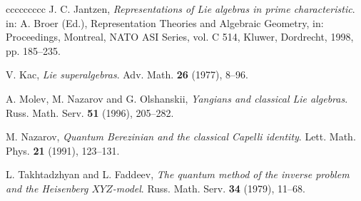 \documentclass[12pt,reqno]{amsart}
\numberwithin{equation}{section}
\theoremstyle{Theorem}
\theoremstyle{remark}
\numberwithin{equation}{section}
\begin{document}
\begin{thebibliography}{ccccccccc}
  J. C. Jantzen,
 {\em Representations of Lie algebras in prime characteristic}.
in: A. Broer (Ed.), Representation Theories and Algebraic Geometry, in: Proceedings, Montreal, NATO ASI Series, vol. C 514, Kluwer, Dordrecht, 1998, pp. 185--235.

 V. Kac, {\em Lie superalgebras}.
Adv. Math. \textbf{26} (1977), 8--96.

 A. Molev, M. Nazarov and G. Olshanskii,
{\em Yangians and classical Lie algebras}.
Russ. Math. Serv. \textbf{51} (1996), 205--282.

 M. Nazarov, 
{\em Quantum Berezinian and the classical Capelli identity}.
Lett. Math. Phys. \textbf{21} (1991), 123--131.

 L. Takhtadzhyan and L. Faddeev, {\em The quantum method of the inverse problem and the Heisenberg $XYZ$-model}.
Russ. Math. Serv. \textbf{34} (1979), 11--68.
\end{thebibliography}
\end{document}
